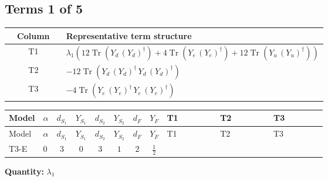 \documentclass[8pt]{article}
\begin{document}
\begin{landscape}
\subsection*{Terms 1 of 5}
\begin{center}
\begin{tabular}{@{}c >{\raggedright\arraybackslash}p{0.82\linewidth}@{}}
\toprule
Column & Representative term structure \\
\midrule
T1 & \(\displaystyle {\lambda_1} (12 \operatorname{Tr}\!\left({Y_d}\,\left({Y_d}\right)^{\dagger}\right)+4 \operatorname{Tr}\!\left({Y_e}\,\left({Y_e}\right)^{\dagger}\right)+12 \operatorname{Tr}\!\left({Y_u}\,\left({Y_u}\right)^{\dagger}\right))\) \\
\midrule
T2 & \(\displaystyle -12 \operatorname{Tr}\!\left({Y_d}\,\left({Y_d}\right)^{\dagger}\,{Y_d}\,\left({Y_d}\right)^{\dagger}\right)\) \\
\midrule
T3 & \(\displaystyle -4 \operatorname{Tr}\!\left({Y_e}\,\left({Y_e}\right)^{\dagger}\,{Y_e}\,\left({Y_e}\right)^{\dagger}\right)\) \\
\midrule
\bottomrule
\end{tabular}
\end{center}
\smallskip
\tiny
\begin{longtable}{@{}llcccccc >{\raggedright\arraybackslash}p{0.21\linewidth} >{\raggedright\arraybackslash}p{0.21\linewidth} >{\raggedright\arraybackslash}p{0.21\linewidth}@{}}
\toprule
Model & $\alpha$ & $d_{S_1}$ & $Y_{S_1}$ & $d_{S_2}$ & $Y_{S_2}$ & $d_F$ & $Y_F$ & T1 & T2 & T3 \\
\midrule
\endfirsthead
\toprule
Model & $\alpha$ & $d_{S_1}$ & $Y_{S_1}$ & $d_{S_2}$ & $Y_{S_2}$ & $d_F$ & $Y_F$ & T1 & T2 & T3 \\
\midrule
\endhead
T3-E & $0$ & $3$ & $0$ & $3$ & $1$ & $2$ & $\frac{1}{2}$ & \scriptsize\adjustbox{max width=\linewidth}{$\begin{gathered} {\lambda_1} (12 \operatorname{Tr}\!\left({Y_d}\,\left({Y_d}\right)^{\dagger}\right)+4 \operatorname{Tr}\!\left({Y_e}\,\left({Y_e}\right)^{\dagger}\right)+12 \operatorname{Tr}\!\left({Y_u}\,\left({Y_u}\right)^{\dagger}\right))\end{gathered}$} & \scriptsize\adjustbox{max width=\linewidth}{$\begin{gathered} -12 \operatorname{Tr}\!\left({Y_d}\,\left({Y_d}\right)^{\dagger}\,{Y_d}\,\left({Y_d}\right)^{\dagger}\right)\end{gathered}$} & \scriptsize\adjustbox{max width=\linewidth}{$\begin{gathered} -4 \operatorname{Tr}\!\left({Y_e}\,\left({Y_e}\right)^{\dagger}\,{Y_e}\,\left({Y_e}\right)^{\dagger}\right)\end{gathered}$} \\
\midrule
\bottomrule
\end{longtable}
\clearpage
\noindent\textbf{Quantity: }$\lambda_1$\par\smallskip

\end{landscape}
\end{document}
